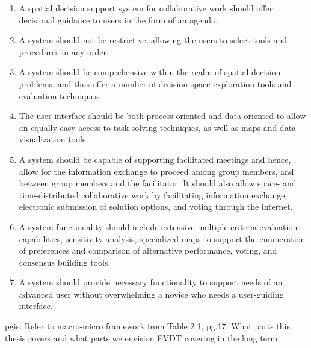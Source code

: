 \begin{enumerate}
    \setlength{\itemsep}{0pt}%
    \setlength{\parskip}{0pt}%
	\item{A spatial decision support system for collaborative work should offer decisional guidance to users in the form of an agenda.}
	\item{A system should not be restrictive, allowing the users to select tools and procedures in any order.}
	\item{A system should be comprehensive within the realm of spatial decision problems, and thus offer a number of decision space exploration tools and evaluation techniques.}
	\item{The user interface should be both process-oriented and data-oriented to allow an equally easy access to task-solving techniques, as well as maps and data visualization tools.}
	\item{A system should be capable of supporting facilitated meetings and hence, allow for the information exchange to proceed among group members, and between group members and the facilitator. It should also allow space- and time-distributed collaborative work by facilitating information exchange, electronic submission of solution options, and voting through the internet.}
	\item{A system functionality should include extensive multiple criteria evaluation capabilities, sensitivity analysis, specialized maps to support the enumeration of preferences and comparison of alternative performance, voting, and consensus building tools.}
	\item{A system should provide necessary functionality to support needs of an advanced user without overwhelming a novice who needs a user-guiding interface.}
\end{enumerate}

\ac{pgis}: Refer to macro-micro framework from Table 2.1, pg.17. What parts this thesis covers and what parts we envision EVDT covering in the long term.

